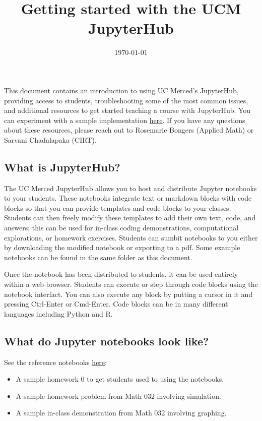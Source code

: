 \documentclass{amsart}
\title{Getting started with the UCM JupyterHub}
\date{\today}
\begin{document}
\maketitle

This document contains an introduction to using UC Merced's JupyterHub, providing access to students, troubleshooting some of the most common issues, and additional resources to get started teaching a course with JupyterHub. You can experiment with a sample implementation \href{https://ucmerced.2i2c.cloud/hub/user-redirect/git-pull?repo=https\%3A\%2F\%2Fgithub.com\%2Frosemariebongers\%2FUCM-Jupyter\&urlpath=tree\%2FUCM-Jupyter\%2F\&branch=main}{here}. If you have any questions about these resources, please reach out to Rosemarie Bongers (Applied Math) or Sarvani Chadalapaka (CIRT).


\subsection*{What is JupyterHub?}

The UC Merced JupyterHub allows you to host and distribute Jupyter notebooks to your students. These notebooks integrate text or markdown blocks with code blocks so that you can provide templates and code blocks to your classes. Students can then freely modify these templates to add their own text, code, and answers; this can be used for in-class coding demonstrations, computational explorations, or homework exercises. Students can sumbit notebooks to you either by downloading the modified notebook or exporting to a pdf. Some example notebooks can be found in the same folder as this document.

Once the notebook has been distributed to students, it can be used entirely within a web browser. Students can execute or step through code blocks using the notebook interfact. You can also execute any block by putting a cursor in it and pressing Ctrl-Enter or Cmd-Enter. Code blocks can be in many different languages including Python and R.

\subsection*{What do Jupyter notebooks look like?}
See the reference notebooks \href{https://ucmerced.2i2c.cloud/hub/user-redirect/git-pull?repo=https\%3A\%2F\%2Fgithub.com\%2Frosemariebongers\%2FUCM-Jupyter\&urlpath=tree\%2FUCM-Jupyter\%2F\&branch=main}{here}:
\begin{itemize}
\item A sample homework 0 to get students used to using the notebooks.
\item A sample homework problem from Math 032 involving simulation.
\item A sample in-class demonstration from Math 032 involving graphing.
\end{itemize}
\end{document}
